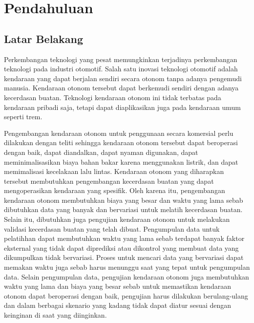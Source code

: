 \chapter{Pendahuluan}


\section{Latar Belakang}

Perkembangan teknologi yang pesat memungkinkan terjadinya perkembangan teknologi
pada industri otomotif. Salah satu inovasi teknologi otomotif adalah kendaraan
yang dapat berjalan sendiri secara otonom tanpa adanya pengemudi manusia.
Kendaraan otonom tersebut dapat berkemudi sendiri dengan adanya kecerdasan
buatan. Teknologi kendaraan otonom ini tidak terbatas pada kendaraan pribadi
saja, tetapi dapat diaplikasikan juga pada kendaraan umum seperti trem.

Pengembangan kendaraan otonom untuk penggunaan secara komersial perlu dilakukan
dengan teliti sehingga kendaraan otonom tersebut dapat beroperasi dengan baik,
dapat diandalkan, dapat nyaman digunakan, dapat meminimalisasikan biaya bahan
bakar karena menggunakan listrik, dan dapat memimalisasi kecelakaan lalu lintas.
Kendaraan otonom yang diharapkan tersebut membutuhkan pengembangan kecerdasan
buatan yang dapat mengoperasikan kendaraan yang spesifik. Oleh karena itu,
pengembangan kendaraan otonom membutuhkan biaya yang besar dan waktu yang lama
sebab dibutuhkan data yang banyak dan bervariasi untuk melatih kecerdasan
buatan. Selain itu, dibutuhkan juga pengujian kendaraan otonom untuk melakukan
validasi kecerdasan buatan yang telah dibuat. Pengumpulan data untuk pelatihhan
dapat membutuhkan waktu yang lama sebab terdapat banyak faktor eksternal yang
tidak dapat diprediksi atau dikontrol yang membuat data yang dikumpulkan tidak
bervariasi. Proses untuk mencari data yang bervariasi dapat memakan waktu juga
sebab harus menunggu saat yang tepat untuk pengumpulan data. Selain pengumpulan
data, pengujian kendaraan otonom juga membutuhkan waktu yang lama dan biaya yang
besar sebab untuk memastikan kendaraan otonom dapat beroperasi dengan baik,
pengujian harus dilakukan berulang-ulang dan dalam berbagai skenario yang kadang
tidak dapat diatur sesuai dengan keinginan di saat yang diinginkan.

